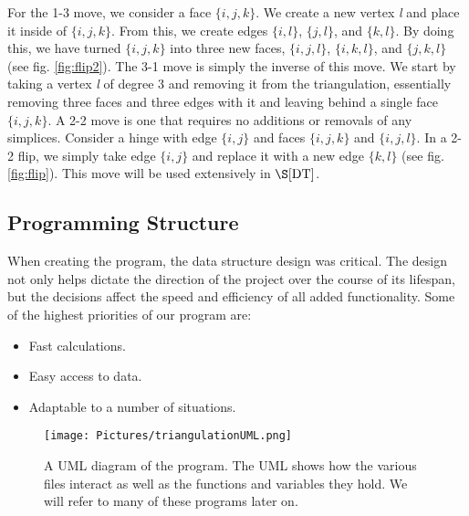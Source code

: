 \documentclass[12pt]{article}
\begin{document}
 For the 1-3 move, we consider a face $\{i, j, k\}$. We create a new vertex \textit{l} and place it inside of $\{i, j, k\}$. From this, we create edges $\{i, l\}$, $\{j, l\}$, and $\{k, l\}$. By doing this, we have turned $\{i, j, k\}$ into three new faces, $\{i, j, l\}$, $\{i, k, l\}$, and $\{j, k, l\}$ (see fig. \ref{fig:flip2}). The 3-1 move is simply the inverse of this move. We start by taking a vertex \textit{l} of degree 3 and removing it from the triangulation, essentially removing three faces and three edges with it and leaving behind a single face $\{i, j, k\}$. A 2-2 move is one that requires no additions or removals of any simplices. Consider a hinge with edge $\{i, j\}$ and faces $\{i, j, k\}$ and $\{i, j, l\}$. In a 2-2 flip, we simply take edge $\{i, j\}$ and replace it with a new edge $\{k, l\}$ (see fig. \ref{fig:flip}). This move will be used extensively in $\S\ref{DT}$.

\subsection{Programming Structure}

 When creating the program, the data structure design was critical. The design not only helps dictate the direction of the project over the course of its lifespan, but the decisions affect the speed and efficiency of all added functionality. Some of the highest priorities of our program are:
 
\begin{itemize}
\item Fast calculations.
\item Easy access to data.
\item Adaptable to a number of situations.
\end{itemize}

\begin{figure}
\begin{center}
\texttt{[image: Pictures/triangulationUML.png]}
\end{center}
\caption{A UML diagram of the program. The UML shows how the various files interact as well as the functions and variables they hold. We will refer to many of these programs later on.}
\label{triUML}
\end{figure}
\end{document}
